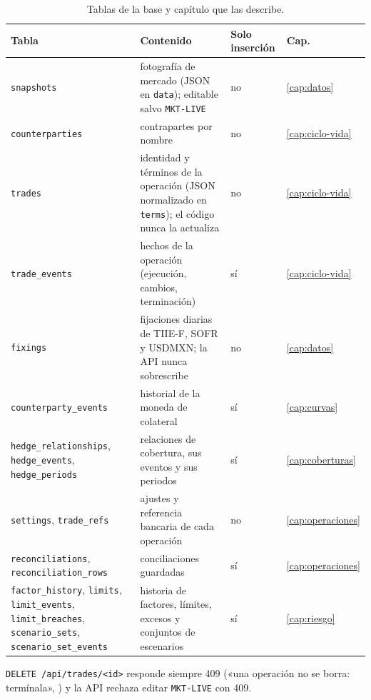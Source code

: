 \begin{sloppypar}
\begin{table}[ht]
  \centering\small
  \caption{Tablas de la base y capítulo que las describe.}\label{tab:cap01-tablas}
  \begin{tabular}{@{}>{\raggedright\arraybackslash}p{3.7cm}>{\raggedright\arraybackslash}p{6.8cm}>{\raggedright\arraybackslash}p{1.9cm}>{\raggedright\arraybackslash}p{1.3cm}@{}}
    \toprule
    Tabla & Contenido & Solo inserción & Cap. \\
    \midrule
    \texttt{snapshots} & fotografía de mercado (JSON en \texttt{data}); editable salvo \texttt{MKT-LIVE} & no & \ref{cap:datos} \\
    \texttt{counterparties} & contrapartes por nombre & no & \ref{cap:ciclo-vida} \\
    \texttt{trades} & identidad y términos de la operación (JSON normalizado en \texttt{terms}); el código nunca la actualiza & no & \ref{cap:ciclo-vida} \\
    \texttt{trade\_events} & hechos de la operación (ejecución, cambios, terminación) & sí & \ref{cap:ciclo-vida} \\
    \texttt{fixings} & fijaciones diarias de TIIE-F, SOFR y USDMXN; la API nunca sobrescribe & no & \ref{cap:datos} \\
    \texttt{counterparty\_events} & historial de la moneda de colateral & sí & \ref{cap:curvas} \\
    \texttt{hedge\_relationships}, \texttt{hedge\_events}, \texttt{hedge\_periods} & relaciones de cobertura, sus eventos y sus periodos & sí & \ref{cap:coberturas} \\
    \texttt{settings}, \texttt{trade\_refs} & ajustes y referencia bancaria de cada operación & no & \ref{cap:operaciones} \\
    \texttt{reconciliations}, \texttt{reconciliation\_rows} & conciliaciones guardadas & sí & \ref{cap:operaciones} \\
    \texttt{factor\_history}, \texttt{limits}, \texttt{limit\_events}, \texttt{limit\_breaches}, \texttt{scenario\_sets}, \texttt{scenario\_set\_events} & historia de factores, límites, excesos y conjuntos de escenarios & sí & \ref{cap:riesgo} \\
    \bottomrule
  \end{tabular}
\end{table}

\texttt{DELETE /api/trades/<id>} responde siempre 409 («una operación no se borra: termínala»,
) y la API rechaza editar \texttt{MKT-LIVE} con 409.


\end{sloppypar}

